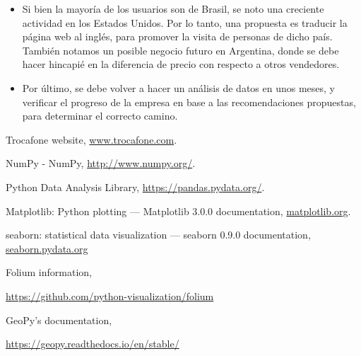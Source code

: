 \documentclass[a4paper ,12pt]{article}
\begin{document}
\begin{itemize}
\item Si bien la mayoría de los usuarios son de Brasil, se noto una creciente actividad en los Estados Unidos. Por lo tanto, una propuesta es traducir la página web al inglés, para promover la visita de personas de dicho país. También notamos un posible negocio futuro en Argentina, donde se debe hacer hincapié en la diferencia de precio con respecto a otros vendedores.  

\item Por último, se debe volver a hacer un análisis de datos en unos meses, y verificar el progreso de la empresa en base a las recomendaciones propuestas, para determinar el correcto camino.

\end{itemize}


\newpage



\begin{thebibliography}{99}
		
	\bibitem{}Trocafone website, \url{www.trocafone.com}.
	
	\bibitem{} NumPy - NumPy, \url{http://www.numpy.org/}.
	
	\bibitem{} Python Data Analysis Library,
	\url{https://pandas.pydata.org/}.
	
	\bibitem{}	Matplotlib: Python plotting — Matplotlib 3.0.0 documentation,
	\url{matplotlib.org}.
	
	
	\bibitem{}seaborn: statistical data visualization — seaborn 0.9.0 documentation,
	\url{seaborn.pydata.org}
	
	\bibitem{} Folium information,
	
	\url{https://github.com/python-visualization/folium}
	
	\bibitem{} GeoPy’s documentation,
	
	\url{
	https://geopy.readthedocs.io/en/stable/}
\end{thebibliography}
\end{document}
